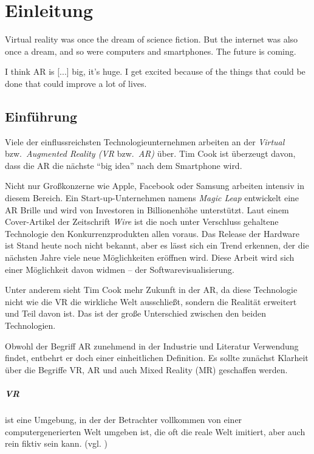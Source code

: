 \chapter{Einleitung}

\begin{fquote}
Virtual reality was once the dream of science fiction. But the internet was also once a dream, and so were computers and smartphones. The future is coming.
\end{fquote}

\begin{fquote}
I think AR is [...] big, it’s huge. I get excited because of the things that could be done that could improve a lot of lives.
\end{fquote}

\section{Einführung}
Viele der einflussreichsten Technologieunternehmen arbeiten an der \emph{Virtual} bzw.\ \emph{Augmented Reality (VR} bzw.\ \emph{AR)} über. Tim Cook ist überzeugt davon, dass die AR die nächste ``big idea'' nach dem Smartphone wird. \cite{theindependent2017}

Nicht nur Großkonzerne wie Apple, Facebook oder Samsung arbeiten intensiv in diesem Bereich. Ein Start-up-Unternehmen namens \emph{Magic Leap} entwickelt eine AR Brille und wird von Investoren in Billionenhöhe unterstützt. \cite{kelly2016untold} Laut einem Cover-Artikel der Zeitschrift \emph{Wire} ist die noch unter Verschluss gehaltene Technologie den Konkurrenzprodukten allen voraus. Das Release der Hardware ist Stand heute noch nicht bekannt, aber es lässt sich ein Trend erkennen, der die nächsten Jahre viele neue Möglichkeiten eröffnen wird. Diese Arbeit wird sich einer Möglichkeit davon widmen -- der Softwarevisualisierung.

Unter anderem sieht Tim Cook mehr Zukunft in der AR, da diese Technologie nicht wie die VR die wirkliche Welt ausschließt, sondern die Realität erweitert und Teil davon ist. Das ist der große Unterschied zwischen den beiden Technologien.

Obwohl der Begriff AR zunehmend in der Industrie und Literatur Verwendung findet, entbehrt er doch einer einheitlichen Definition. Es sollte zunächst Klarheit über die Begriffe VR, AR und auch Mixed Reality (MR) geschaffen werden.

\paragraph{VR} ist eine Umgebung, in der der Betrachter vollkommen von einer computergenerierten Welt umgeben ist, die oft die reale Welt imitiert, aber auch rein fiktiv sein kann. (vgl. \cite{milgram1995augmented})

